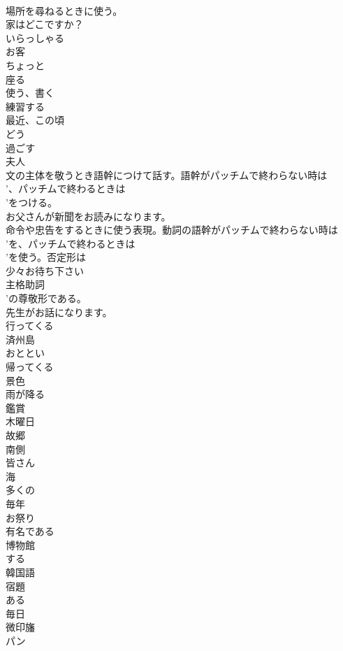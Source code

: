 \documentclass[8pt]{extreport}
\begin{document}
\begin{CJK}{UTF8}{min}
\\	場所を尋ねるときに使う。	
\\	家はどこですか？
\\	いらっしゃる
\\	お客
\\	ちょっと
\\	座る
\\	使う、書く
\\	練習する
\\	最近、この頃
\\	どう
\\	過ごす
\\	夫人
\\	文の主体を敬うとき語幹につけて話す。語幹がパッチムで終わらない時は
\\	'、パッチムで終わるときは
\\	'をつける。	
\\	お父さんが新聞をお読みになります。
\\	命令や忠告をするときに使う表現。動詞の語幹がパッチムで終わらない時は
\\	'を、パッチムで終わるときは
\\	'を使う。否定形は
\\	少々お待ち下さい
\\	主格助詞
\\	'の尊敬形である。	
\\	先生がお話になります。
\\	行ってくる
\\	済州島
\\	おととい
\\	帰ってくる
\\	景色
\\	雨が降る
\\	鑑賞
\\	木曜日
\\	故郷
\\	南側
\\	皆さん
\\	海
\\	多くの
\\	毎年
\\	お祭り
\\	有名である
\\	博物館
\\	する
\\	韓国語
\\	宿題
\\	ある
\\	毎日
\\	微印旛
\\	パン

\end{CJK}
\end{document}
